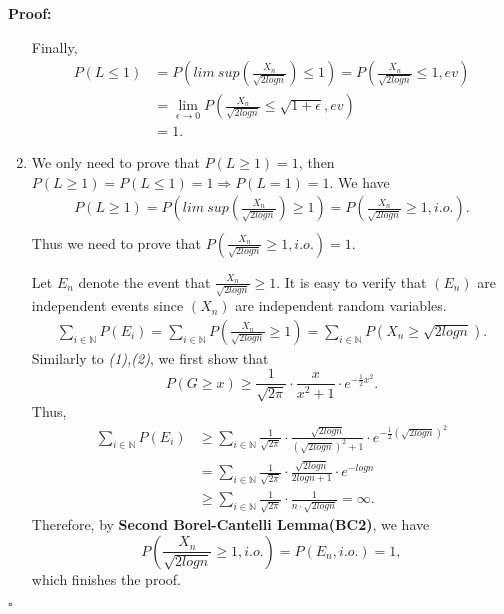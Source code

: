 \documentclass[UTF8, 12pt]{article}
\newenvironment{proof}{\noindent\ignorespaces\textbf{Proof:}}{\hfill $\square$\par\noindent}
\theoremstyle{break}
\begin{document}
\begin{proof}
\begin{enumerate}
            Finally,
            \begin{align*}
                P(L \leq 1) &= P( lim\ sup(\frac{X_n}{\sqrt{2logn}}) \leq 1) = P(\frac{X_n}{\sqrt{2logn}} \leq 1, ev) \\
                &= \lim_{\epsilon\to 0} P(\frac{X_n}{\sqrt{2logn}} \leq \sqrt{1 + \epsilon}, ev) \\
                &= 1.
            \end{align*}
            
            \item We only need to prove that $ P(L \geq 1) = 1$, then $ P(L \geq 1) = P(L \leq 1) = 1 \Longrightarrow P(L = 1) = 1 $.
            We have
            \begin{align*}
                P(L \geq 1) = P(lim\ sup(\frac{X_n}{\sqrt{2logn}}) \geq 1) = P(\frac{X_n}{\sqrt{2logn}} \geq 1, i.o.). \\ 
            \end{align*}
            Thus we need to prove that $P(\frac{X_n}{\sqrt{2logn}} \geq 1, i.o.) = 1$.

            Let $E_n$ denote the event that $\frac{X_n}{\sqrt{2logn}} \geq 1$. It is easy to verify that $(E_n)$ are independent events since $(X_n)$ are independent random variables.
            \begin{align*}
                \sum_{i \in \mathbb{N}} P(E_i) = \sum_{i \in \mathbb{N}} P(\frac{X_n}{\sqrt{2logn}} \geq 1) = \sum_{i \in \mathbb{N}} P(X_n \geq \sqrt{2logn}).
            \end{align*}
            Similarly to \textit{(1),(2)}, we first show that $$ P(G \geq x) \geq \frac{1}{\sqrt{2\pi}}\cdot \frac{x}{x^2+1} \cdot e^{-\frac{1}{2}x^2}. $$
            Thus,
            \begin{align*}
                \sum_{i \in \mathbb{N}} P(E_i) &\geq \sum_{i \in \mathbb{N}} \frac{1}{\sqrt{2\pi}}\cdot \frac{\sqrt{2logn}}{(\sqrt{2logn})^2+1} \cdot e^{-\frac{1}{2}(\sqrt{2logn})^2} \\
                &= \sum_{i \in \mathbb{N}} \frac{1}{\sqrt{2\pi}}\cdot \frac{\sqrt{2logn}}{2logn+1} \cdot e^{-logn} \\
                &\geq \sum_{i \in \mathbb{N}} \frac{1}{\sqrt{2\pi}} \cdot \frac{1}{n \cdot \sqrt{2logn}} = \infty.
            \end{align*}
            Therefore, by \textbf{Second Borel-Cantelli Lemma(BC2)}, we have $$ P(\frac{X_n}{\sqrt{2logn}} \geq 1, i.o.) = P(E_n, i.o.) = 1, $$ which finishes the proof.
        \end{enumerate}
    \end{proof}
\end{document}
